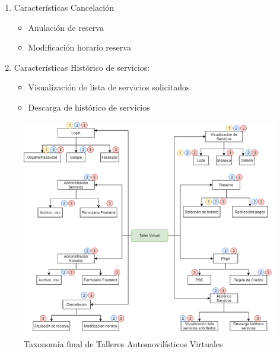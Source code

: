 \documentclass[10pt,a4paper,openany]{book}
\begin{document}
\begin{enumerate}
\item Características Cancelación
	\begin{itemize}
	\item Anulación de reserva
	\item Modificación horario reserva
	\end{itemize}
\item Características Histórico de servicios:
	\begin{itemize}
	\item Visualización de lista de servicios solicitados
    \item Descarga de histórico de servicios
	\end{itemize}			
\end{enumerate}


\begin{figure}[h]
	\centering
	\includegraphics[width=1\textwidth]{img2}
	\caption{Taxonomía final de Talleres Automovilísticos Virtuales}
	\label{fig:img2}
\end{figure}
\end{document}
